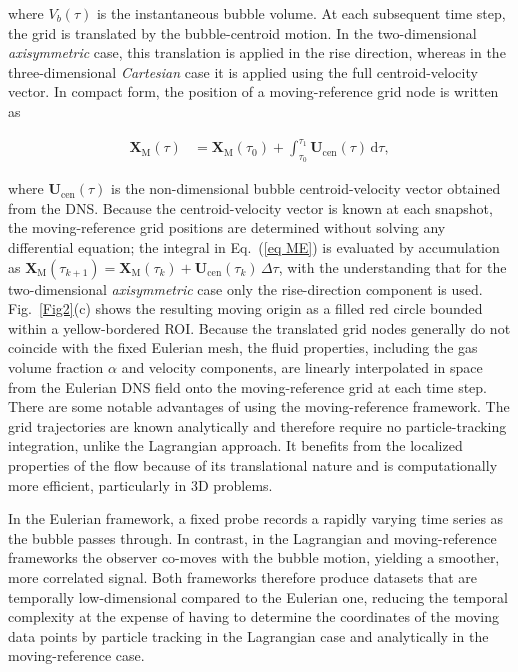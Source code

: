 \documentclass[a4paper,fleqn]{cas-sc}
\begin{document}
	\noindent where $V_b(\tau)$ is the instantaneous bubble volume. At each subsequent time step, the grid is translated by the bubble-centroid motion. In the two-dimensional \textit{axisymmetric} case, this translation is applied in the rise direction, whereas in the three-dimensional \textit{Cartesian} case it is applied using the full centroid-velocity vector. In compact form, the position of a moving-reference grid node is written as
	
	\begin{align}
		\mathbf{X}_{\mathrm{M}}(\tau) &= \mathbf{X}_{\mathrm{M}}(\tau_0) + \int_{\tau_0}^{\tau_1} \mathbf{U}_{\mathrm{cen}}(\tau)\,\mathrm{d}\tau,
		\label{eq ME}
	\end{align}
	
	\noindent where $\mathbf{U}_{\mathrm{cen}}(\tau)$ is the non-dimensional bubble centroid-velocity vector obtained from the DNS. Because the centroid-velocity vector is known at each snapshot, the moving-reference grid positions are determined without solving any differential equation; the integral in Eq.~(\ref{eq ME}) is evaluated by accumulation as $\mathbf{X}_{\mathrm{M}}(\tau_{k+1}) = \mathbf{X}_{\mathrm{M}}(\tau_k) + \mathbf{U}_{\mathrm{cen}}(\tau_k)\,\Delta\tau$, with the understanding that for the two-dimensional \textit{axisymmetric} case only the rise-direction component is used. Fig.~\ref{Fig2}(c) shows the resulting moving origin as a filled red circle bounded within a yellow-bordered ROI. Because the translated grid nodes generally do not coincide with the fixed Eulerian mesh, the fluid properties, including the gas volume fraction $\alpha$ and velocity components, are linearly interpolated in space from the Eulerian DNS field onto the moving-reference grid at each time step. There are some notable advantages of using the moving-reference framework. The grid trajectories are known analytically and therefore require no particle-tracking integration, unlike the Lagrangian approach. It benefits from the localized properties of the flow because of its translational nature and is computationally more efficient, particularly in 3D problems.
	
	In the Eulerian framework, a fixed probe records a rapidly varying time series as the bubble passes through. In contrast, in the Lagrangian and moving-reference frameworks the observer co-moves with the bubble motion, yielding a smoother, more correlated signal. Both frameworks therefore produce datasets that are temporally low-dimensional compared to the Eulerian one, reducing the temporal complexity at the expense of having to determine the coordinates of the moving data points by particle tracking in the Lagrangian case and analytically in the moving-reference case.
	
\end{document}
